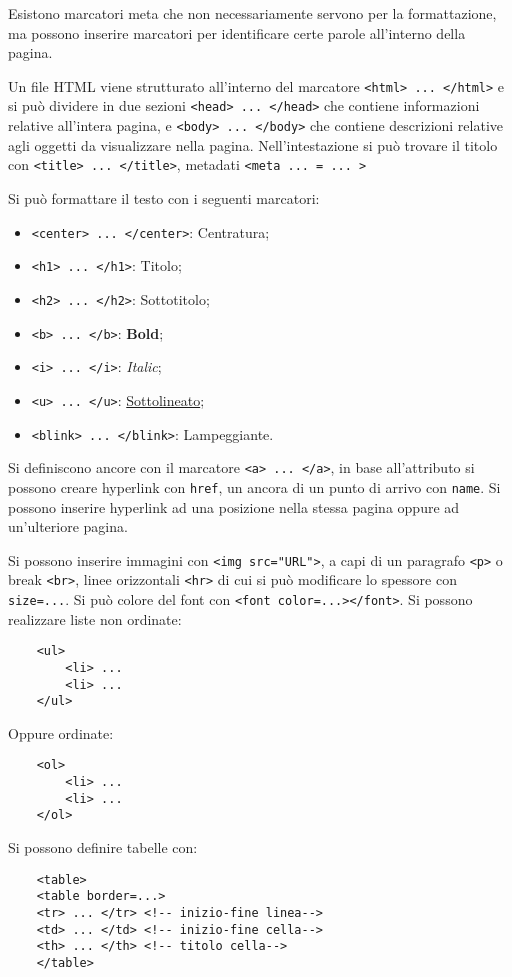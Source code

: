 \documentclass{article}
\numberwithin{equation}{subsection}
\begin{document}
Esistono marcatori meta che non necessariamente servono per la formattazione, ma possono inserire marcatori per identificare certe parole all'interno della pagina. 

Un file HTML viene strutturato all'interno del marcatore \verb|<html> ... </html>| e si può dividere in due sezioni \verb|<head> ... </head>| che contiene informazioni relative all'intera pagina, 
e \verb|<body> ... </body>| che contiene descrizioni relative agli oggetti da visualizzare nella pagina. 
Nell'intestazione si può trovare il titolo con \verb|<title> ... </title>|, metadati \verb|<meta ... = ... >|

Si può formattare il testo con i seguenti marcatori:
\begin{itemize}
    \item \verb|<center> ... </center>|: Centratura;
    \item \verb|<h1> ... </h1>|: Titolo;
    \item \verb|<h2> ... </h2>|: Sottotitolo;
    \item \verb|<b> ... </b>|: \textbf{Bold};
    \item \verb|<i> ... </i>|: \textit{Italic};
    \item \verb|<u> ... </u>|: \underline{Sottolineato};
    \item \verb|<blink> ... </blink>|: Lampeggiante. 
\end{itemize}


Si definiscono ancore con il marcatore \verb|<a> ... </a>|, in base all'attributo si possono creare hyperlink con \verb|href|, un ancora di un punto di arrivo con \verb|name|. 
Si possono inserire hyperlink ad una posizione nella stessa pagina oppure ad un'ulteriore pagina. 

Si possono inserire immagini con \verb|<img src="URL">|, a capi di un paragrafo \verb|<p>| o break \verb|<br>|, linee orizzontali \verb|<hr>| di cui si può modificare 
lo spessore con \verb|size=...|. Si può colore del font con \verb|<font color=...></font>|. 
Si possono realizzare liste non ordinate:
\begin{verbatim}
    <ul>
        <li> ...
        <li> ...
    </ul>
\end{verbatim}
Oppure ordinate:
\begin{verbatim}
    <ol>
        <li> ...
        <li> ...
    </ol>
\end{verbatim}

Si possono definire tabelle con:
\begin{verbatim}
    <table>
    <table border=...>
    <tr> ... </tr> <!-- inizio-fine linea-->
    <td> ... </td> <!-- inizio-fine cella-->
    <th> ... </th> <!-- titolo cella-->
    </table>
\end{verbatim}
\end{document}
